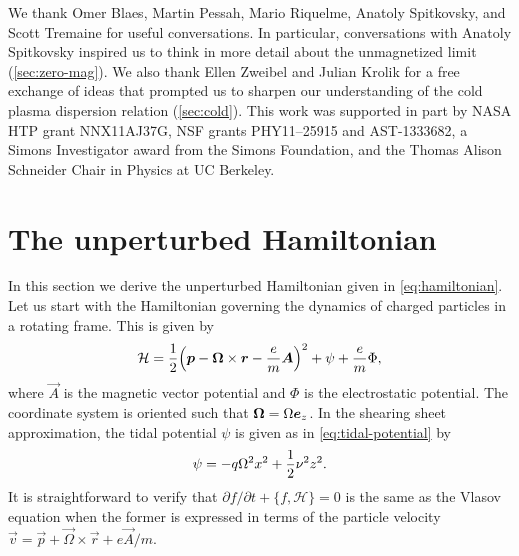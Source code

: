 \documentclass[aps,pre,notitlepage,amsmath,amssymb,amsfonts,nobibnotes,nofootinbib]{revtex4-1}
\begin{document}
\acknowledgments{}

We thank Omer Blaes, Martin Pessah, Mario Riquelme, Anatoly Spitkovsky, and
Scott Tremaine for useful conversations. In particular, conversations with
Anatoly Spitkovsky inspired us to think in more detail about the unmagnetized
limit (\cref{sec:zero-mag}). We also thank Ellen Zweibel and Julian Krolik for
a free exchange of ideas that prompted us to sharpen our understanding of the
cold plasma dispersion relation (\cref{sec:cold}). This work was supported in
part by NASA HTP grant NNX11AJ37G, NSF grants PHY11--25915 and AST-1333682, a
Simons Investigator award from the Simons Foundation, and the Thomas Alison
Schneider Chair in Physics at UC Berkeley.

\appendix
{}

\section{The unperturbed Hamiltonian}
\label{app:unperturbed-hamiltonian}

In this section we derive the unperturbed Hamiltonian given in
\cref{eq:hamiltonian}. Let us start with the Hamiltonian governing the
dynamics of charged particles in a rotating frame. This is given by
\begin{equation}
  \mathcal{H} = \frac{1}{2}{\left(
    \vec{p} - \vec{\Omega}\times\vec{r} - \cm\vec{A}
  \right)}^2 + \psi + \cm\Phi,
\end{equation}
where $\vec{A}$ is the magnetic vector potential and $\Phi$ is the
electrostatic potential. The coordinate system is oriented such that
$\bm{\Omega}=\Omega\bm{e}_z$. In the shearing sheet approximation, the tidal
potential $\psi$ is given as in \cref{eq:tidal-potential} by
\begin{equation}
  \psi = -q\Omega^2 x^2 + \frac{1}{2}\nu^2 z^2.
\end{equation}
It is straightforward to verify that
$\partial{}f/\partial{}t+\{f,\mathcal{H}\}=0$ is the same as the Vlasov
equation  when the former is expressed in terms of
the particle velocity $\vec{v}=\vec{p}+\vec{\Omega}\times\vec{r}+e\vec{A}/m$.
\end{document}
